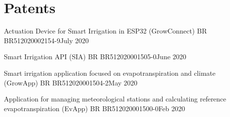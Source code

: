\section{Patents}
    \resumeSubHeadingListStart

    \resumePubliSubheading
    {Actuation Device for Smart Irrigation in ESP32 (GrowConnect)}
    {BR BR512020002154-9}{July 2020}

    \resumePubliSubheading
    {Smart Irrigation API (SIA)}
    {BR BR512020001505-0}{June 2020}

    \resumePubliSubheading
    {Smart irrigation application focused on evapotranspiration and climate (GrowApp)}
    {BR BR512020001504-2}{May 2020}

    \resumePubliSubheading
    {Application for managing meteorological stations and calculating reference evapotranspiration (EvApp)}
    {BR BR512020001500-0}{Feb 2020}

    \resumeSubHeadingListEnd